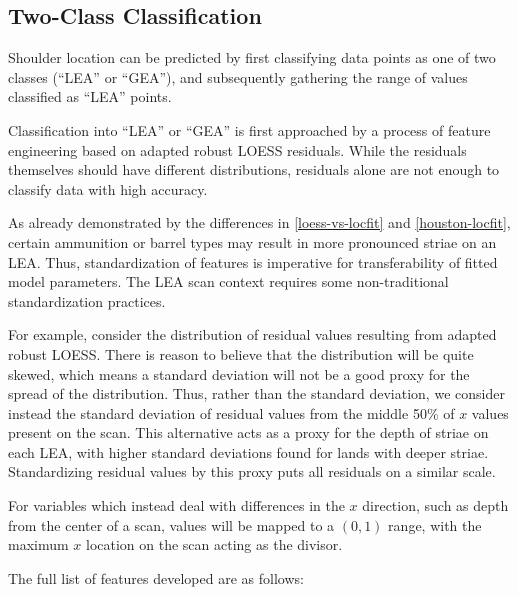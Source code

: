 \documentclass[12pt]{article}
\begin{document}
\subsection{Two-Class Classification}

Shoulder location can be predicted by first classifying data points as
one of two classes (``LEA'' or ``GEA''), and subsequently gathering the
range of values classified as ``LEA'' points.

Classification into ``LEA'' or ``GEA'' is first approached by a process
of feature engineering based on adapted robust LOESS residuals. While
the residuals themselves should have different distributions, residuals
alone are not enough to classify data with high accuracy.

As already demonstrated by the differences in \autoref{loess-vs-locfit}
and \autoref{houston-locfit}, certain ammunition or barrel types may
result in more pronounced striae on an LEA. Thus, standardization of
features is imperative for transferability of fitted model parameters.
The LEA scan context requires some non-traditional standardization
practices.

For example, consider the distribution of residual values resulting from
adapted robust LOESS. There is reason to believe that the distribution
will be quite skewed, which means a standard deviation will not be a
good proxy for the spread of the distribution. Thus, rather than the
standard deviation, we consider instead the standard deviation of
residual values from the middle 50\% of \(x\) values present on the
scan. This alternative acts as a proxy for the depth of striae on each
LEA, with higher standard deviations found for lands with deeper striae.
Standardizing residual values by this proxy puts all residuals on a
similar scale.

For variables which instead deal with differences in the \(x\)
direction, such as depth from the center of a scan, values will be
mapped to a \((0, 1)\) range, with the maximum \(x\) location on the
scan acting as the divisor.

The full list of features developed are as follows:
\end{document}
